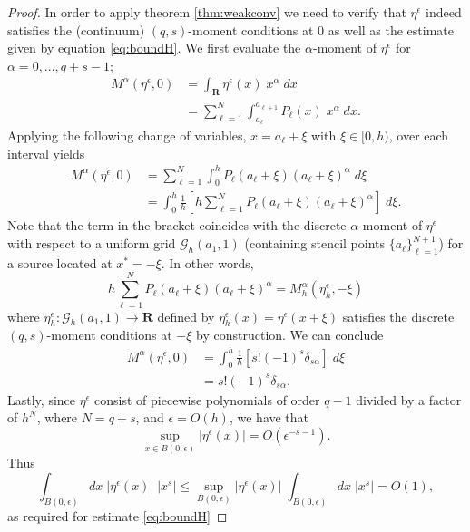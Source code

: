 \begin{proof}
	In order to apply theorem \ref{thm:weakconv} we need to verify that $\eta^\epsilon$ indeed satisfies the (continuum) $(q,s)$-moment conditions at $0$ as well as the estimate given by equation \ref{eq:boundH}.
	We first evaluate the $\alpha$-moment of $\eta^\epsilon$ for $\alpha=0,...,q+s-1$;
	\begin{subequations}
	\begin{align*}
		M^\alpha(\eta^\epsilon,0) &= \int_{\mathbf R} \eta^\epsilon(x) \;x^\alpha\; dx \\
			&= \sum_{\ell=1}^N \int_{a_\ell}^{a_{\ell+1}} P_\ell(x) \;x^\alpha \; dx.
	\end{align*}
	\end{subequations}
	Applying the following change of variables, $x= a_\ell + \xi$ with $\xi\in[0,h)$, over each interval yields
	\begin{subequations}
	\begin{align*}
		M^\alpha(\eta^\epsilon,0) &= \sum_{\ell=1}^N \int_{0}^h P_\ell(a_\ell+\xi) (a_\ell+\xi)^\alpha \; d\xi \\
			&= \int_{0}^h \frac{1}{h} \left[ h \sum_{\ell=1}^N P_\ell(a_\ell+\xi) (a_\ell+\xi)^\alpha \right]\; d\xi.
	\end{align*}
	\end{subequations}
	Note that the term in the bracket coincides with the discrete $\alpha$-moment of $\eta^\epsilon$ with respect to a uniform grid $\mathcal G_h(a_1,1)$ (containing stencil points $\{a_\ell\}_{\ell=1}^{N+1}$) for a source located at $x^*=-\xi$.
	In other words,
	\[
		h \sum_{\ell=1}^N P_\ell(a_\ell+\xi) (a_\ell+\xi)^\alpha = M_h^\alpha(\eta_h^\epsilon,-\xi)
	\]
	where $\eta_h^\epsilon:\mathcal G_h(a_1,1)\to \mathbf R$ defined by $\eta_h^\epsilon(x) = \eta^\epsilon(x+\xi)$ satisfies the discrete $(q,s)$-moment conditions at $-\xi$ by construction.
	We can conclude
	\begin{align*}
		M^\alpha(\eta^\epsilon,0) &= \int_{0}^h  \frac{1}{h} \left[ s! (-1)^{s} \delta_{s\alpha}\right]  \; d\xi \\
		&= s! (-1)^{s} \delta_{s\alpha}.
	\end{align*}
	Lastly, since $\eta^\epsilon$ consist of piecewise polynomials of order $q-1$ divided by a factor of $h^N$, where $N=q+s$, and $\epsilon=O(h)$, we have that
\[
	\sup_{x\in B(0,\epsilon)} |\eta^\epsilon(x)| = O(\epsilon^{-s-1}).
\] 
Thus
\[
	\int_{B(0,\epsilon)} dx\; |\eta^\epsilon(x)| \; |x^s| \le \sup_{B(0,\epsilon)} |\eta^\epsilon(x)|  \; \int_{B(0,\epsilon)} dx\; |x^s| = O(1),
\]
as required for estimate \ref{eq:boundH}

\end{proof}


